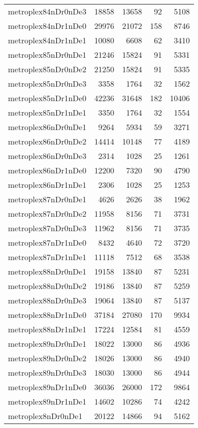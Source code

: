 \begin{tabular}{lrrrr}
metroplex84nDr0nDe3 & 18858 & 13658 & 92 & 5108 \\
metroplex84nDr1nDe0 & 29976 & 21072 & 158 & 8746 \\
metroplex84nDr1nDe1 & 10080 & 6608 & 62 & 3410 \\
metroplex85nDr0nDe1 & 21246 & 15824 & 91 & 5331 \\
metroplex85nDr0nDe2 & 21250 & 15824 & 91 & 5335 \\
metroplex85nDr0nDe3 & 3358 & 1764 & 32 & 1562 \\
metroplex85nDr1nDe0 & 42236 & 31648 & 182 & 10406 \\
metroplex85nDr1nDe1 & 3350 & 1764 & 32 & 1554 \\
metroplex86nDr0nDe1 & 9264 & 5934 & 59 & 3271 \\
metroplex86nDr0nDe2 & 14414 & 10148 & 77 & 4189 \\
metroplex86nDr0nDe3 & 2314 & 1028 & 25 & 1261 \\
metroplex86nDr1nDe0 & 12200 & 7320 & 90 & 4790 \\
metroplex86nDr1nDe1 & 2306 & 1028 & 25 & 1253 \\
metroplex87nDr0nDe1 & 4626 & 2626 & 38 & 1962 \\
metroplex87nDr0nDe2 & 11958 & 8156 & 71 & 3731 \\
metroplex87nDr0nDe3 & 11962 & 8156 & 71 & 3735 \\
metroplex87nDr1nDe0 & 8432 & 4640 & 72 & 3720 \\
metroplex87nDr1nDe1 & 11118 & 7512 & 68 & 3538 \\
metroplex88nDr0nDe1 & 19158 & 13840 & 87 & 5231 \\
metroplex88nDr0nDe2 & 19186 & 13840 & 87 & 5259 \\
metroplex88nDr0nDe3 & 19064 & 13840 & 87 & 5137 \\
metroplex88nDr1nDe0 & 37184 & 27080 & 170 & 9934 \\
metroplex88nDr1nDe1 & 17224 & 12584 & 81 & 4559 \\
metroplex89nDr0nDe1 & 18022 & 13000 & 86 & 4936 \\
metroplex89nDr0nDe2 & 18026 & 13000 & 86 & 4940 \\
metroplex89nDr0nDe3 & 18030 & 13000 & 86 & 4944 \\
metroplex89nDr1nDe0 & 36036 & 26000 & 172 & 9864 \\
metroplex89nDr1nDe1 & 14602 & 10286 & 74 & 4242 \\
metroplex8nDr0nDe1 & 20122 & 14866 & 94 & 5162 \\

\end{tabular}
